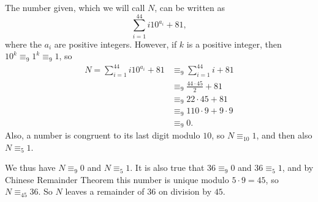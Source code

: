 The number given, which we will call $N$, can be written as
$$\sum_{i=1}^{44} i10^{a_i}+81,$$
where the $a_i$ are positive integers.
However, if $k$ is a positive integer, then $10^k \equiv_9 1^k \equiv_9 1$,
so
\begin{align*}
	N = \sum_{i=1}^{44} i10^{a_i}+81 &\equiv_9 \sum_{i=1}^{44} i +81\\
																 &\equiv_9 \frac{44\cdot45}{2} +81 \\
	&\equiv_9 22 \cdot 45 +81 \\
	&\equiv_9 110 \cdot 9 + 9 \cdot 9 \\
	&\equiv_9 0.
\end{align*}
Also, a number is congruent to its last digit modulo $10$, so 
$N \equiv_{10} 1$, and then also $N \equiv_5 1$.

We thus have $N \equiv_9 0$ and $N \equiv_5 1$. It is also true that $36 \equiv_9 0$ and
$36 \equiv_5 1$, and by Chinese Remainder Theorem this number is unique
modulo $5 \cdot 9=45$, so $N \equiv_{45} 36$. So $N$ leaves a remainder of
$36$ on division by $45$.
